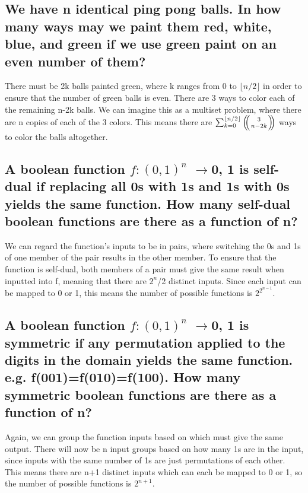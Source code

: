 \documentclass[11pt,twosided]{article}
\begin{document}

\subsection{We have n identical ping pong balls. In how many ways may we paint them red, white, blue, and green if we use green paint on an even number of them?}
There must be 2k balls painted green, where k ranges from 0 to ${\lfloor n/2 \rfloor}$ in order to ensure that the number of green balls is even. There are 3 ways to color each of the remaining n-2k balls. We can imagine this as a multiset problem, where there are n copies of each of the 3 colors. This means there are \(\sum_{k=0}^{\lfloor n/2 \rfloor} \multiset{3}{n-2k}\) ways to color the balls altogether. 


\subsection{A boolean function $ f: {(0, 1)}^n $  $\rightarrow $0, 1 is self-dual if replacing all 0s with 1s and 1s with 0s yields the same function. How many self-dual boolean functions are there as a function of n?}
We can regard the function's inputs to be in pairs, where switching the 0s and 1s of one member of the pair results in the other member. To ensure that the function is self-dual, both members of a pair must give the same result when inputted into f, meaning that there are $2^n$/2 distinct inputs. Since each input can be mapped to 0 or 1, this means the number of possible functions is $2^{2^{n-1}}$.


\subsection{A boolean function $ f: {(0, 1)}^n $  $\rightarrow $0, 1 is symmetric if any permutation applied to the digits in the domain yields the same function. e.g. f(001)=f(010)=f(100). How many symmetric boolean functions are there as a function of n?}
Again, we can group the function inputs based on which must give the same output. There will now be n input groups based on how many 1s are in the input, since inputs with the same number of 1s are just permutations of each other. This means there are n+1 distinct inputs which can each be mapped to 0 or 1, so the number of possible functions is $2^{n+1}$.
\end{document}
